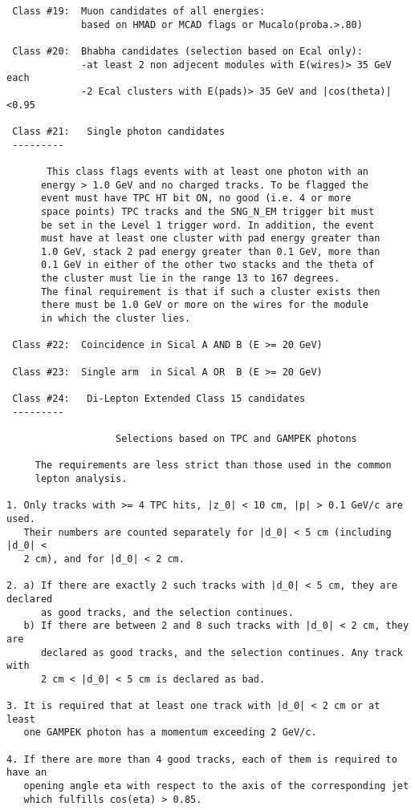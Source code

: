 \begin{verbatim}
 Class #19:  Muon candidates of all energies:
             based on HMAD or MCAD flags or Mucalo(proba.>.80)
 
 Class #20:  Bhabha candidates (selection based on Ecal only):
             -at least 2 non adjecent modules with E(wires)> 35 GeV each
             -2 Ecal clusters with E(pads)> 35 GeV and |cos(theta)|<0.95
 
 Class #21:   Single photon candidates
 ---------
 
       This class flags events with at least one photon with an
      energy > 1.0 GeV and no charged tracks. To be flagged the
      event must have TPC HT bit ON, no good (i.e. 4 or more
      space points) TPC tracks and the SNG_N_EM trigger bit must
      be set in the Level 1 trigger word. In addition, the event
      must have at least one cluster with pad energy greater than
      1.0 GeV, stack 2 pad energy greater than 0.1 GeV, more than
      0.1 GeV in either of the other two stacks and the theta of
      the cluster must lie in the range 13 to 167 degrees.
      The final requirement is that if such a cluster exists then
      there must be 1.0 GeV or more on the wires for the module
      in which the cluster lies.
 
 Class #22:  Coincidence in Sical A AND B (E >= 20 GeV)
 
 Class #23:  Single arm  in Sical A OR  B (E >= 20 GeV)
 
 Class #24:   Di-Lepton Extended Class 15 candidates
 ---------
 
                   Selections based on TPC and GAMPEK photons
 
     The requirements are less strict than those used in the common
     lepton analysis.
 
1. Only tracks with >= 4 TPC hits, |z_0| < 10 cm, |p| > 0.1 GeV/c are used.
   Their numbers are counted separately for |d_0| < 5 cm (including |d_0| <
   2 cm), and for |d_0| < 2 cm.
 
2. a) If there are exactly 2 such tracks with |d_0| < 5 cm, they are declared
      as good tracks, and the selection continues.
   b) If there are between 2 and 8 such tracks with |d_0| < 2 cm, they are
      declared as good tracks, and the selection continues. Any track with
      2 cm < |d_0| < 5 cm is declared as bad.
 
3. It is required that at least one track with |d_0| < 2 cm or at least
   one GAMPEK photon has a momentum exceeding 2 GeV/c.
 
4. If there are more than 4 good tracks, each of them is required to have an
   opening angle eta with respect to the axis of the corresponding jet
   which fulfills cos(eta) > 0.85.
 

\end{verbatim}
